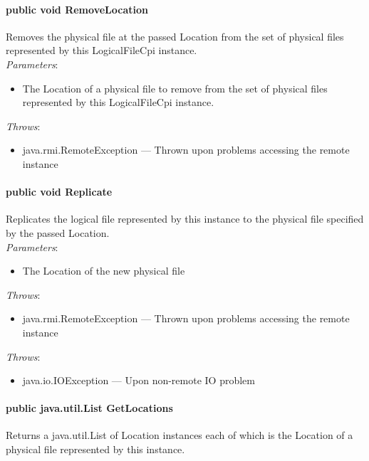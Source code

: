 \documentclass[$Date: 2003/06/26 19:29:31 $]{glabarticle}
\begin{document}
\paragraph{public void RemoveLocation}

Removes the physical file at the passed Location from the set of
physical files represented by this LogicalFileCpi instance.\\

\textit{Parameters}:
\begin{itemize}
\item[] The Location of a physical file to remove from the set of physical files represented by this LogicalFileCpi 
instance.
\end{itemize}

 \textit{Throws}:
 \begin{itemize}
 \item[] java.rmi.RemoteException --- Thrown upon problems accessing the remote instance 
 \end{itemize}

\paragraph{public void Replicate}

Replicates the logical file represented by this instance to the
physical file specified by the passed Location. \\

\textit{Parameters}:
\begin{itemize}
\item[] The Location of the new physical file
\end{itemize}

 \textit{Throws}:
 \begin{itemize}
 \item[] java.rmi.RemoteException --- Thrown upon problems accessing the remote instance 
 \end{itemize}
 
\textit{Throws}:
\begin{itemize}
\item[] java.io.IOException --- Upon non-remote IO problem 
\end{itemize} 

\paragraph{public java.util.List GetLocations}

Returns a java.util.List of Location instances each of which is the Location of
a physical file represented by this instance. \\
\end{document}
